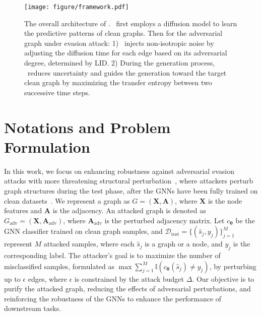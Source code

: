 \begin{figure*}[!htbp]
\centering
\texttt{[image: figure/framework.pdf]}
\vspace{-1.7em}
\caption{The overall architecture of \ModelName. \ModelName~first employs a diffusion model to learn the predictive patterns of clean graphs. Then for the adversarial graph under evasion attack: 1) \ModelName\ injects non-isotropic noise by adjusting the diffusion time for each edge based on its adversarial degree, determined by LID. 2) During the generation process, \ModelName\ reduces uncertainty and guides the generation toward the target clean graph by maximizing the transfer entropy between two successive time steps.}
\label{fig:framework}
\end{figure*}


\section{Notations and Problem Formulation} 
In this work, we focus on enhancing robustness against adversarial evasion attacks with more threatening structural perturbation~\cite{zugner2018adversarial}, 
where attackers perturb graph structures during the test phase, after the GNNs have been fully trained on clean datasets~\cite{biggio2013evasion}.
We represent a graph as $G=(\mathbf{X},\mathbf{A})$, where $\mathbf{X}$ is the node features and $\mathbf{A}$ is the adjacency. An attacked graph is denoted as $G_{\text{adv}}=(\mathbf{X}, \mathbf{A}_{\text{adv}})$, where $\mathbf{A}_{\text{adv}}$ is the perturbed adjacency matrix.
Let $c_{\boldsymbol{\theta}}$ be the GNN classifier trained on clean graph samples, and  $\mathcal{D}_\text{test} = \{(\hat{s}_j, y_j)\}_{j=1}^M$ represent $M$ attacked samples, where each $\hat{s}_j$ is a graph or a node, and $y_j$ is the corresponding label. The attacker's goal is to maximize the number of misclassified samples, formulated as $\max \sum_{j=1}^{M} \mathbb{I}(c_{\boldsymbol{\theta}}(\hat{s}_j) \neq y_j)$, by perturbing up to $\epsilon$ edges, where $\epsilon$ is constrained by the attack budget $\Delta$.
Our objective is to purify the attacked graph, reducing the effects of adversarial perturbations, and reinforcing the robustness of the GNNs to enhance the performance of downstream tasks.